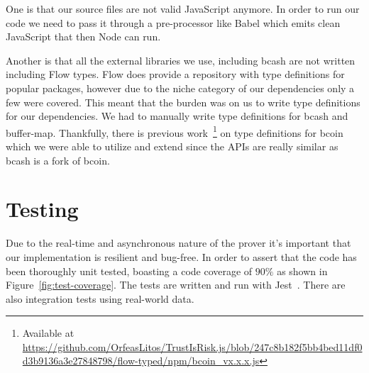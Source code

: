 One is that our source files are not valid JavaScript anymore. In order to run our code we need to pass it through a pre-processor like Babel which emits clean JavaScript that then Node can run.

Another is that all the external libraries we use, including bcash are not written including Flow types. Flow does provide a repository with type definitions for popular packages, however due to the niche category of our dependencies only a few were covered. This meant that the burden was on us to write type definitions for our dependencies. We had to manually write type definitions for bcash and buffer-map. Thankfully, there is previous work~\footnote{Available at \url{https://github.com/OrfeasLitos/TrustIsRisk.js/blob/247c8b182f5bb4bed11df0d3b9136a3e27848798/flow-typed/npm/bcoin_vx.x.x.js}} on type definitions for bcoin which we were able to utilize and extend since the APIs are really similar as bcash is a fork of bcoin.

\section{Testing}
Due to the real-time and asynchronous nature of the prover it's important that our implementation is resilient and bug-free. In order to assert that the code has been thoroughly unit tested, boasting a code coverage of $90\%$ as shown in Figure~\ref{fig:test-coverage}. The tests are written and run with Jest~\cite{jest}. There are also integration tests using real-world data.

